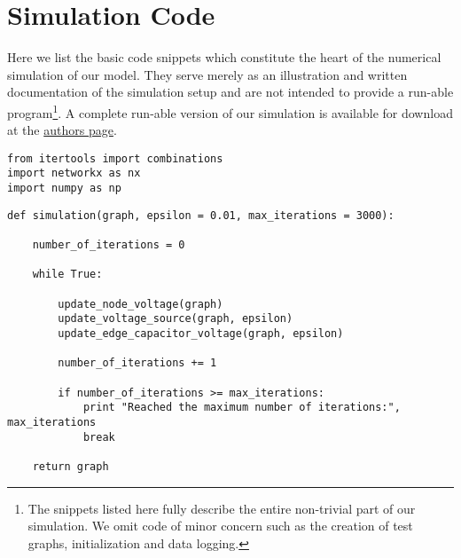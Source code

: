 
\chapter{Simulation Code}\label{app:code}

	Here we list the basic code snippets which constitute the heart of the numerical simulation of our model. They serve merely as an illustration and written documentation of the simulation setup and are not intended to provide a run-able program\footnote{The snippets listed here fully describe the entire non-trivial part of our simulation. We omit code of minor concern such as the creation of test graphs, initialization and data logging.}. A complete run-able version of our simulation is available for download at the \href{https://people.mpi-inf.mpg.de/~mtd/}{authors page}.

\begin{codesnippet}
\begin{verbatim}
from itertools import combinations
import networkx as nx
import numpy as np
\end{verbatim}
\label{code:libaries}
\end{codesnippet}


\begin{codesnippet}
\begin{verbatim}
def simulation(graph, epsilon = 0.01, max_iterations = 3000):

	number_of_iterations = 0

	while True:
		
		update_node_voltage(graph)
		update_voltage_source(graph, epsilon)
		update_edge_capacitor_voltage(graph, epsilon)
		
		number_of_iterations += 1	

		if number_of_iterations >= max_iterations:
			print "Reached the maximum number of iterations:", max_iterations
			break

	return graph
\end{verbatim}
\label{code:simulation}
\end{codesnippet}


